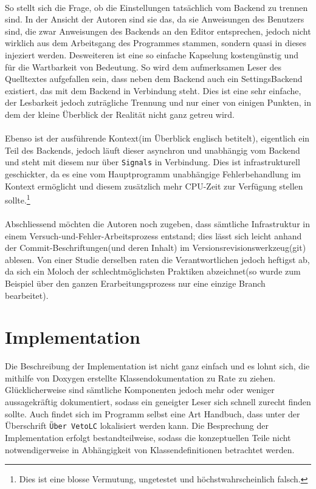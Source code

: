 \paragraph{}
    So stellt sich die Frage, ob die Einstellungen tatsächlich vom Backend zu trennen sind. In der Ansicht der Autoren sind sie das, da sie Anweisungen des Benutzers
    sind, die zwar Anweisungen des Backends an den Editor entsprechen, jedoch nicht wirklich aus dem Arbeitsgang des Programmes stammen, sondern quasi in dieses injeziert
    werden. Desweiteren ist eine so einfache Kapselung kostengünstig und für die Wartbarkeit von Bedeutung. So wird dem aufmerksamen Leser des Quelltextes aufgefallen sein, 
    dass neben dem Backend auch ein SettingsBackend existiert, das mit dem Backend in Verbindung steht. Dies ist eine sehr einfache, der Lesbarkeit jedoch zuträgliche
    Trennung und nur einer von einigen Punkten, in dem der kleine Überblick der Realität nicht ganz getreu wird.
\paragraph{}
    Ebenso ist der ausführende Kontext(im Überblick englisch betitelt), eigentlich ein Teil des Backends, jedoch läuft dieser asynchron und unabhängig vom Backend und
    steht mit diesem nur über \texttt{Signals} in Verbindung. Dies ist infrastrukturell geschickter, da es eine vom Hauptprogramm unabhängige Fehlerbehandlung im Kontext
    ermöglicht und diesem zusätzlich mehr CPU-Zeit zur Verfügung stellen sollte.\footnote{Dies ist eine blosse Vermutung, ungetestet und höchstwahrscheinlich falsch.}
\paragraph{}
    Abschliessend möchten die Autoren noch zugeben, dass sämtliche Infrastruktur in einem Versuch-und-Fehler-Arbeitsprozess entstand; dies lässt sich leicht anhand der
    Commit-Beschriftungen(und deren Inhalt) im Versionsrevisionswerkzeug(git) ablesen. Von einer Studie derselben raten die Verantwortlichen jedoch heftigst ab, da sich
    ein Moloch der schlechtmöglichsten Praktiken abzeichnet(so wurde zum Beispiel über den ganzen Erarbeitungsprozess nur eine einzige Branch bearbeitet).

\newpage

\section{Implementation} \label{sec:Imp}
	Die Beschreibung der Implementation ist nicht ganz einfach und es lohnt sich, die mithilfe von Doxygen erstellte Klassendokumentation zu Rate zu ziehen. Glücklicher\-weise
    sind sämtliche Komponenten jedoch mehr oder weniger aussagekräftig dokumentiert, sodass ein geneigter Leser sich schnell zurecht finden sollte. Auch findet sich im
    Programm selbst eine Art Handbuch, dass unter der Überschrift \texttt{Über VetoLC} lokalisiert werden kann. Die Besprechung der Implementation erfolgt bestandteilweise,
    sodass die konzeptuellen Teile nicht notwendigerweise in Abhängigkeit von Klassendefinitionen betrachtet werden.

